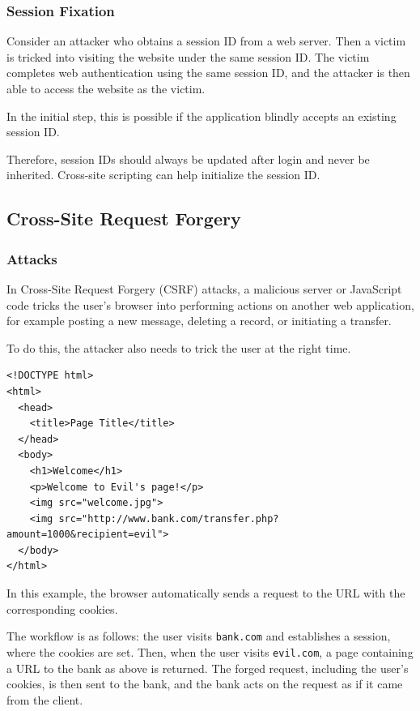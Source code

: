 \subsubsection{Session Fixation}
Consider an attacker who obtains a session ID from a web server. Then a victim is tricked into visiting the website under the same session ID. The victim completes web authentication using the same session ID, and the attacker is then able to access the website as the victim. 

\begin{remark}
  In the initial step, this is possible if the application blindly accepts an existing session ID. 
\end{remark}

Therefore, session IDs should always be updated after login and never be inherited. Cross-site scripting can help initialize the session ID.  

\subsection{Cross-Site Request Forgery}
\subsubsection{Attacks}
In Cross-Site Request Forgery (CSRF) attacks, a malicious server or JavaScript code tricks the user's browser into performing actions on another web application, for example posting a new message, deleting a record, or initiating a transfer. 

To do this, the attacker also needs to trick the user at the right time. 

\begin{verbatim}
<!DOCTYPE html>
<html>
  <head>
    <title>Page Title</title>
  </head>
  <body>
    <h1>Welcome</h1>
    <p>Welcome to Evil's page!</p>
    <img src="welcome.jpg">
    <img src="http://www.bank.com/transfer.php?amount=1000&recipient=evil">
  </body>
</html>
\end{verbatim}

In this example, the browser automatically sends a request to the URL with the corresponding cookies. 

The workflow is as follows: the user visits \texttt{bank.com} and establishes a session, where the cookies are set. Then, when the user visits \texttt{evil.com}, a page containing a URL to the bank as above is returned. The forged request, including the user's cookies, is then sent to the bank, and the bank acts on the request as if it came from the client. 


